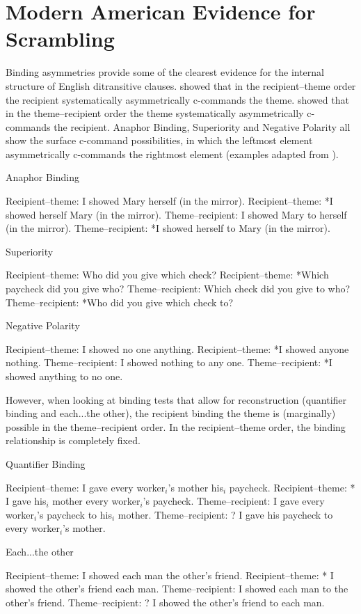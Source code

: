 \documentclass[11pt]{upenndiss}
\begin{document}
\chapter{Modern American Evidence for Scrambling}
Binding asymmetries provide some of the clearest evidence for the internal structure of English ditransitive clauses. \cite{Barss.1986} showed that in the recipient--theme order the recipient systematically asymmetrically c-commands the theme. \cite{Aoun.1989} showed that in the theme--recipient order the theme systematically asymmetrically c-commands the recipient.  Anaphor Binding, Superiority and Negative Polarity all show the surface c-command possibilities, in which the leftmost element asymmetrically c-commands the rightmost element (examples adapted from \cite{Aoun.1989}).
\newpage
\begin{exe}
\ex Anaphor Binding
\begin{xlist}
\ex Recipient--theme: I showed Mary herself (in the mirror).
\ex Recipient--theme: *I showed herself Mary (in the mirror).
\ex Theme--recipient: I showed Mary to herself (in the mirror).
\ex Theme--recipient: *I showed herself to Mary (in the mirror).
\end{xlist}
\ex Superiority
\begin{xlist}
\ex Recipient--theme: Who did you give which check?
\ex Recipient--theme: *Which paycheck did you give who?
\ex Theme--recipient: Which check did you give to who?
\ex Theme--recipient: *Who did you give which check to?
\end{xlist}
\ex Negative Polarity
\begin{xlist}
\ex Recipient--theme: I showed no one anything.
\ex Recipient--theme: *I showed anyone nothing.
\ex Theme--recipient: I showed nothing to any one.
\ex Theme--recipient: *I showed anything to no one.
\end{xlist}
\end{exe}

However, when looking at binding tests that allow for reconstruction (quantifier binding and each...the other), the recipient binding the theme is (marginally) possible in the theme--recipient order. In the recipient--theme order, the binding relationship is completely fixed. 

\begin{exe}
\ex Quantifier Binding
\begin{xlist}
\ex Recipient--theme: I gave every worker$_i$'s mother his$_i$ paycheck.
\ex Recipient--theme: * I gave his$_i$ mother every worker$_i$'s paycheck.
\ex Theme--recipient: I gave every worker$_i$'s paycheck to his$_i$ mother.
\ex Theme--recipient: ? I gave his paycheck to every worker$_i$'s mother.
\end{xlist}

\ex Each...the other
\begin{xlist}
\ex Recipient--theme: I showed each man the other's friend.
\ex Recipient--theme: * I showed the other's friend each man.
\ex Theme--recipient: I showed each man to the other's friend.
\ex Theme--recipient: ? I showed the other's friend to each man.
\end{xlist}
\end{exe}
\end{document}
